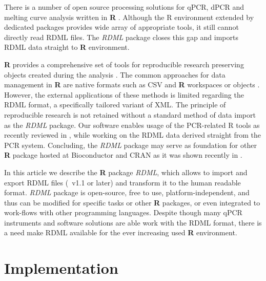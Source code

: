 \documentclass{bioinfo}
\begin{document}
	There is a number of open source processing solutions for qPCR, dPCR and melting curve 
	analysis written in \textbf{R} \cite{pabinger_2014, ritz_qpcr_2008, roediger_RJ_2013, 
	roediger2015chippcr}. Although the R environment extended by 
	dedicated packages provides wide array of appropriate tools, it still cannot 
	directly read RDML files. The \textit{RDML} package closes this gap and imports 
	RDML data straight to \textbf{R} environment.
	
	\textbf{R} provides a comprehensive set of tools for reproducible 
	research preserving objects created during the analysis 
	\cite{roediger2015r,roediger2015chippcr}. The common approaches for data 
	management in \textbf{R} are native formats such as CSV and \textbf{R} 
	workspaces or objects \cite{roediger_rkward_2012}. However, the external 
	applications of these methods is limited regarding the RDML format, a 
	specifically tailored variant of XML. The principle of reproducible research is 
	not retained without a standard method of data import as the \textit{RDML} 
	package. Our software enables usage of the PCR-related R tools as recently 
	reviewed in \cite{pabinger_2014}, while working on the RDML data derived 
	straight from the PCR system. Concluding, the \textit{RDML} package may serve as 
	foundation for other \textbf{R} package hosted at Bioconductor 
	\cite{gentleman_2004} and CRAN as it was shown recently in \cite{roediger2015r}.
	
	In this article we describe the \textbf{R} package \textit{RDML}, which allows to
	import and export RDML files (~v1.1 or later) and transform it to the
	human readable format. \textit{RDML} package is open-source, free to use,
	platform-independent, and thus can be modified for specific tasks or other
	\textbf{R} packages, or even integrated to work-flows with other programming
	languages. Despite though many qPCR instruments and software solutions are able
	work with the RDML format, there is a need make RDML available for the ever
	increasing used \textbf{R} environment.
	
	\section{Implementation}
	
\end{document}
